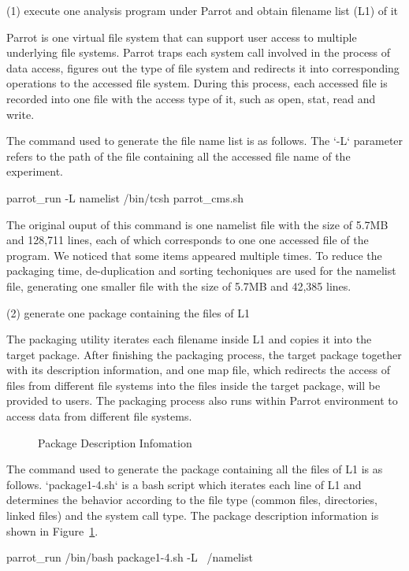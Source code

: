 \documentclass{acm_proc_article-sp}
\begin{document}
(1) execute one analysis program under Parrot and obtain filename list (L1) of it

Parrot is one virtual file system that can support user access to multiple underlying file systems. Parrot traps each system call involved in the process of data access, figures out the type of file system and redirects it into corresponding operations to the accessed file system. During this process, each accessed file is recorded into one file with the access type of it, such as open, stat, read and write.

The command used to generate the file name list is as follows. The `-L` parameter refers to the path of the file containing all the accessed file name of the experiment.

parrot\_run -L namelist /bin/tcsh parrot\_cms.sh

The original ouput of this command is one namelist file with the size of 5.7MB
and 128,711 lines, each of which corresponds to one one accessed file of the
program. We noticed that some items appeared multiple times. To reduce the
packaging time, de-duplication and sorting techoniques are used for the
namelist file, generating one smaller file with the size of 5.7MB and 42,385
lines.

(2) generate one package containing the files of L1 

The packaging utility iterates each filename inside L1 and copies it into the
target package. After finishing the packaging process, the target package
together with its description information, and one map file, which redirects
the access of files from different file systems into the files inside the target package, will be
provided to users. The packaging process also runs within Parrot environment to
access data from different file systems.

\begin{figure}
\centering
{}
\caption{Package Description Infomation}
\label{fig:package-info}
\end{figure}
The command used to generate the package containing all the files of L1 is as follows. 
`package1-4.sh` is a bash script which iterates each line of L1 and
determines the behavior according to the file type (common files, directories,
linked files) and the system call type.
The package description information is shown in Figure~\ref{fig:package-info}.

parrot\_run /bin/bash package1-4.sh -L ~/namelist
\end{document}
